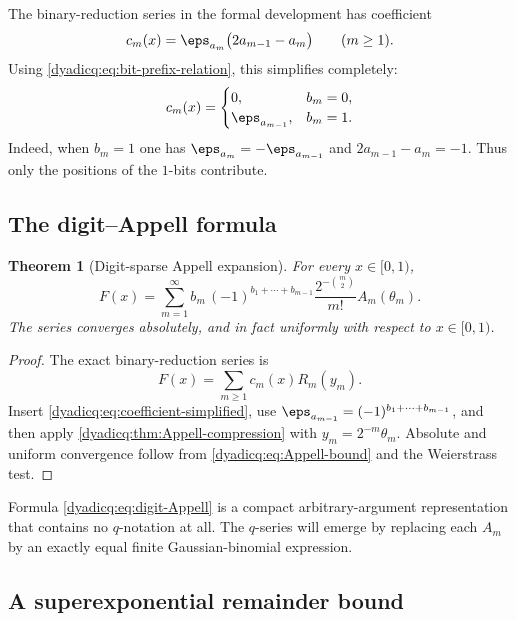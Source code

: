 \documentclass[11pt,oneside]{article}
\newtheorem{theorem}{Theorem}[section]
\theoremstyle{definition}
\theoremstyle{remark}
\begin{document}
The binary-reduction series in the formal development has coefficient
\begin{equation}\label{dyadicq:eq:source-coefficient}
  c_m(x)=\eps_{a_m}\bigl(2a_{m-1}-a_m\bigr)
  \qquad(m\ge1).
\end{equation}
Using \eqref{dyadicq:eq:bit-prefix-relation}, this simplifies completely:
\begin{equation}\label{dyadicq:eq:coefficient-simplified}
  c_m(x)=
  \begin{cases}
   0,&b_m=0,\\
   \eps_{a_{m-1}},&b_m=1.
  \end{cases}
\end{equation}
Indeed, when $b_m=1$ one has
$\eps_{a_m}=-\eps_{a_{m-1}}$ and $2a_{m-1}-a_m=-1$.
Thus only the positions of the $1$-bits contribute.

\subsection{The digit--Appell formula}

\begin{theorem}[Digit-sparse Appell expansion]\label{dyadicq:thm:digit-Appell}
For every $x\in[0,1)$,
\begin{equation}\label{dyadicq:eq:digit-Appell}
 \boxed{
 F(x)=
 \sum_{m=1}^{\infty}
 b_m\,(-1)^{b_1+\cdots+b_{m-1}}
 \frac{2^{-\binom m2}}{m!}
 A_m(\theta_m).}
\end{equation}
The series converges absolutely, and in fact uniformly with respect to
$x\in[0,1)$.
\end{theorem}

\begin{proof}
The exact binary-reduction series is
\[
 F(x)=\sum_{m\ge1}c_m(x)R_m(y_m).
\]
Insert \eqref{dyadicq:eq:coefficient-simplified}, use
$\eps_{a_{m-1}}=(-1)^{b_1+\cdots+b_{m-1}}$, and then apply
\cref{dyadicq:thm:Appell-compression} with $y_m=2^{-m}\theta_m$.
Absolute and uniform convergence follow from
\eqref{dyadicq:eq:Appell-bound} and the Weierstrass test.
\end{proof}

Formula \eqref{dyadicq:eq:digit-Appell} is a compact arbitrary-argument representation
that contains no $q$-notation at all.  The $q$-series will emerge by replacing
each $A_m$ by an exactly equal finite Gaussian-binomial expression.

\subsection{A superexponential remainder bound}
\end{document}
